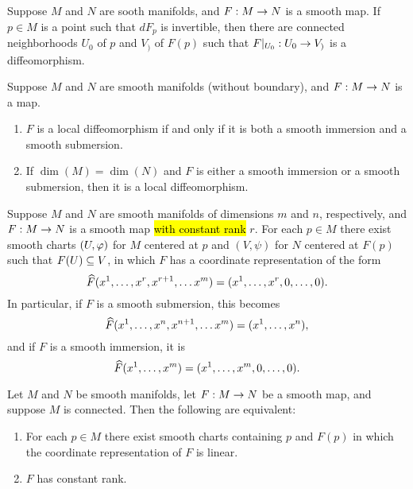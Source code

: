 \setcounter{thm}{4}

\begin{thm}
Suppose $M$ and $N$ are sooth manifolds, and $F:M\rightarrow N$ is a smooth map. If $p\in M$ is a point such that $dF_p$ is invertible, then there are connected neighborhoods $U_0$ of $p$ and $V_)$ of $F(p)$ such that $F|_{U_0}:U_0\rightarrow V_)$ is a diffeomorphism.
\end{thm}

\setcounter{thm}{7}

\begin{prop}
Suppose $M$ and $N$ are smooth manifolds (without boundary), and $F:M\rightarrow N$ is a map.
\begin{enumerate}
    \item $F$ is a local diffeomorphism if and only if it is both a smooth immersion and a smooth submersion.
    \item If $\dim(M) = \dim(N)$ and $F$ is either a smooth immersion or a smooth submersion, then it is a local diffeomorphism.
\end{enumerate}
\end{prop}

\setcounter{thm}{11}

\begin{thm}
Suppose $M$ and $N$ are smooth manifolds of dimensions $m$ and $n$, respectively, and $F:M\rightarrow N$ is a smooth map \hl{with constant rank} $r$. For each $p\in M$ there exist smooth charts $(U,\varphi)$ for $M$ centered at $p$ and $(V,\psi)$ for $N$ centered at $F(p)$ such that $F(U)\subseteq V$, in which $F$ has a coordinate representation of the form 
\[\widehat F(x^1,\ldots,x^r,x^{r+1},\dots x^m) = (x^1,\ldots,x^r,0,\ldots,0).\]
In particular, if $F$ is a smooth submersion, this becomes
\[\widehat F(x^1,\ldots,x^n,x^{n+1},\dots x^m) = (x^1,\ldots,x^n),\]
and if $F$ is a smooth immersion, it is
\[\widehat F(x^1,\ldots, x^m) = (x^1,\ldots,x^m,0,\ldots,0).\]
\end{thm}

\begin{cor}
Let $M$ and $N$ be smooth manifolds, let $F:M\rightarrow N$ be a smooth map, and suppose $M$ is connected. Then the following are equivalent:
\begin{enumerate}
    \item For each $p\in M$ there exist smooth charts containing $p$ and $F(p)$ in which the coordinate representation of $F$ is linear.
    \item $F$ has constant rank.
\end{enumerate}
\end{cor}


